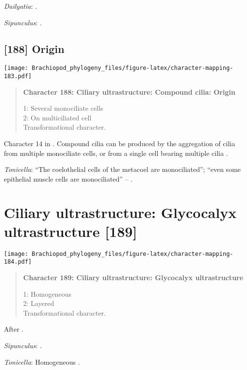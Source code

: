 \documentclass[openany]{book}
\theoremstyle{definition}
\theoremstyle{definition}
\theoremstyle{definition}
\theoremstyle{remark}
\begin{document}
\hypertarget{Dailyatia-coding-187}{}
\emph{Dailyatia}: \citet{Nielsen1987}.

\hypertarget{Sipunculus-coding-187}{}
\emph{Sipunculus}: \citet{Reed1982}.

\subsection*{{[}188{]} Origin}\label{origin-1}

\texttt{[image: Brachiopod\_phylogeny\_files/figure-latex/character-mapping-183.pdf]}

\begin{quote}
\textbf{Character 188: Ciliary ultrastructure: Compound cilia: Origin}

1: Several monociliate cells\\
2: On multiciliated cell\\
Transformational character.
\end{quote}

Character 14 in \citet{Glenner2004}. Compound cilia can be produced by
the aggregation of cilia from multiple monociliate cells, or from a
single cell bearing multiple cilia \citep{Nielsen1987}.

\hypertarget{Tonicella-coding-188}{}
\emph{Tonicella}: ``The coelothelial cells of the metacoel are
monociliated''; ``even some epithelial muscle cells are monociliated''
-- \citet{Luter1995}.

\section{Ciliary ultrastructure: Glycocalyx ultrastructure
{[}189{]}}\label{ciliary-ultrastructure-glycocalyx-ultrastructure-189}

\texttt{[image: Brachiopod\_phylogeny\_files/figure-latex/character-mapping-184.pdf]}

\begin{quote}
\textbf{Character 189: Ciliary ultrastructure: Glycocalyx
ultrastructure}

1: Homogeneous\\
2: Layered\\
Transformational character.
\end{quote}

After \citet{Lundin2009}.

\hypertarget{Sipunculus-coding-189}{}
\emph{Sipunculus}: \citet{Reed1982}.

\hypertarget{Tonicella-coding-189}{}
\emph{Tonicella}: Homogeneous \citep{Luter1995}.
\end{document}
